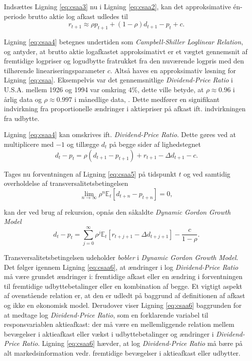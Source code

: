 \documentclass[
  a4paper,
  oneside]{memoir}
\begin{document}
Indsættes Ligning \eqref{eq:csaa3} nu i Ligning \eqref{eq:csaa2}, kan det approksimative én-periode brutto aktie log afkast udledes til
\begin{equation}
r_{t+1}\approx \rho p_{t+1} + (1-\rho)d_{t+1}-p_t+c. \label{eq:csaa4}
\end{equation}

Ligning \eqref{eq:csaa4} betegnes undertiden som \emph{Campbell-Shiller Loglinear Relation}, og antyder, at brutto aktie logafkastet approksimativt er et vægtet gennemsnit af fremtidige logpriser og logudbytte fratrukket fra den nuværende logpris med den tilhørende lineariseringsparameter \(c\). Altså haves en approksimativ løsning for Ligning \eqref{eq:csaa}. Eksempelvis var det gennemsnitlige \emph{Dividend-Price Ratio} i U.S.A. mellem 1926 og 1994 var omkring \(4\%\), dette ville betyde, at \(\rho\approx 0.96\) i årlig data og \(\rho\approx 0.997\) i månedlige data, \citep{Campbell1997}. Dette medfører en signifikant indvirkning fra proportionelle ændringer i aktiepriser på afkast ift. indvirkningen fra udbytte.

Ligning \eqref{eq:csaa4} kan omskrives ift. \emph{Dividend-Price Ratio}. Dette gøres ved at multiplicere med \(-1\) og tillægge \(d_t\) på begge sider af lighedstegnet
\begin{equation}
d_t-p_t=\rho(d_{t+1}-p_{t+1}) + r_{t+1} -\Delta d_{t+1}-c. \label{eq:csaa5}
\end{equation}

Tages nu forventningen af Ligning \eqref{eq:csaa5} på tidspunkt \(t\) og ved samtidig overholdelse af transversalitetsbetingelsen
\[\lim_{n\to\infty } \rho^n\mathbb{E}_t\left[d_{t+n}-p_{t+n}\right]= 0,\]

kan der ved brug af rekursion, opnås den såkaldte \emph{Dynamic Gordon Growth Model}
\begin{equation}
d_t-p_t=\sum_{j=0}^\infty \rho^j \mathbb{E}_t\left[r_{t+j+1}-\Delta d_{t+j+1}\right]-\frac{c}{1-\rho}. \label{eq:csaa6}
\end{equation}

Transversalitetsbetingelsen udeholder \emph{bobler} i \emph{Dynamic Gordon Growth Model}. Det følger igennem Ligning \eqref{eq:csaa6}, at ændringer i log \emph{Dividend-Price Ratio} må være grundet ændringer i: fremtidige afkast eller en ændring i forventningen til fremtidige udbyttebetalinger eller en kombination af begge. Et vigtigt aspekt af ovenstående relation er, at den er udledt på baggrund af definitionen af afkast og ikke en økonomisk model. Derudover viser Ligning \eqref{eq:csaa6} baggrunden for at medtage log \emph{Dividend-Price Ratio}, som en forklarende variabel til responsvariablen aktieafkast: der må være en mellemliggende relation mellem bevægelser i aktieafkast eller vækst i udbyttebetalinger og ændringer i \emph{Dividend-Price Ratio}. Ligning \eqref{eq:csaa6} hævder, at log \emph{Dividend-Price Ratio} må bære på alt markedsinformation vedr. fremtidige bevægelser i aktieafkast eller udbytter.
\end{document}

